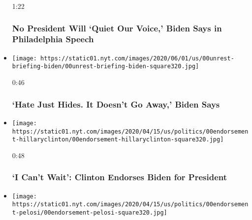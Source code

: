 \begin{itemize}
  1:22

  \hypertarget{no-president-will-quiet-our-voice-biden-says-in-philadelphia-speech}{%
  \subsubsection{No President Will `Quiet Our Voice,' Biden Says in
  Philadelphia
  Speech}\label{no-president-will-quiet-our-voice-biden-says-in-philadelphia-speech}}
\item
  \href{https://www.nytimes.com/video/us/elections/100000007168118/hate-just-hides-it-doesnt-go-away-biden-says.html?action=click\&module=video-series-bar\&region=header\&pgtype=Article\&playlistId=video/2020-Elections}{}

  \texttt{[image: https://static01.nyt.com/images/2020/06/01/us/00unrest-briefing-biden/00unrest-briefing-biden-square320.jpg]}

  0:46

  \hypertarget{hate-just-hides-it-doesnt-go-away-biden-says}{%
  \subsubsection{`Hate Just Hides. It Doesn't Go Away,' Biden
  Says}\label{hate-just-hides-it-doesnt-go-away-biden-says}}
\item
  \href{https://www.nytimes.com/video/us/politics/100000007111258/watch-live-hillary-clinton-endorses-biden.html?action=click\&module=video-series-bar\&region=header\&pgtype=Article\&playlistId=video/2020-Elections}{}

  \texttt{[image: https://static01.nyt.com/images/2020/04/15/us/politics/00endorsement-hillaryclinton/00endorsement-hillaryclinton-square320.jpg]}

  0:48

  \hypertarget{i-cant-wait-clinton-endorses-biden-for-president}{%
  \subsubsection{`I Can't Wait': Clinton Endorses Biden for
  President}\label{i-cant-wait-clinton-endorses-biden-for-president}}
\item
  \href{https://www.nytimes.com/video/us/politics/100000007109631/pelosi-endorses-biden.html?action=click\&module=video-series-bar\&region=header\&pgtype=Article\&playlistId=video/2020-Elections}{}

  \texttt{[image: https://static01.nyt.com/images/2020/04/15/us/politics/00endorsement-pelosi/00endorsement-pelosi-square320.jpg]}


\end{itemize}
